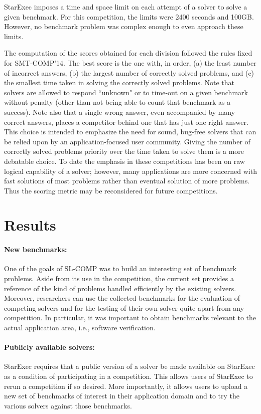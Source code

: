 \documentclass[twoside,11pt]{article}
\begin{document}
StarExec imposes a time and space limit on each attempt of a solver to solve a given benchmark. For this competition, the limits were 2400 seconds and 100GB. However, no benchmark problem was complex enough to even approach these limits.

The computation of the scores obtained for each division followed the rules fixed for SMT-COMP'14.
The best score is the one with, in order, (a) the least number of incorrect answers, (b) the largest number of correctly solved problems, and (c) the smallest time taken in solving the correctly solved problems.
Note that solvers are allowed to respond ``unknown" or to time-out on a given benchmark without penalty (other than not being able to count that benchmark as a success).
Note also that a single wrong answer, even accompanied by many correct answers, places a competitor behind one that has just one right answer. This choice is intended to emphasize the need for sound, bug-free solvers that can be relied upon by an application-focused user community. Giving the number of correctly
solved problems priority over the time taken to solve them is a more debatable choice. To date the emphasis in these competitions has been on raw logical capability of a solver; however, many applications are more concerned with fast solutions of most problems rather than eventual solution of more problems. Thus the scoring metric may be reconsidered for future competitions.




\section{Results}

\paragraph{New benchmarks:}
One of the goals of SL-COMP was to build an interesting set of benchmark problems. 
Aside from its use in the competition, the current set provides a reference of the kind of problems handled efficiently by the existing solvers.
Moreover, researchers can use the collected benchmarks for the evaluation of competing solvers and for the testing of their own solver quite apart from any competition. 
In particular, it was important to obtain benchmarks relevant to the actual application area, i.e., software verification.

\paragraph{Publicly available solvers:} StarExec requires that a public version of a solver be made available on StarExec as a condition of participating in a competition. This allows users of StarExec to rerun a competition if so desired. More importantly, it allows users to upload a new set of benchmarks of interest in their application domain and to try the various solvers against those benchmarks.
\end{document}

